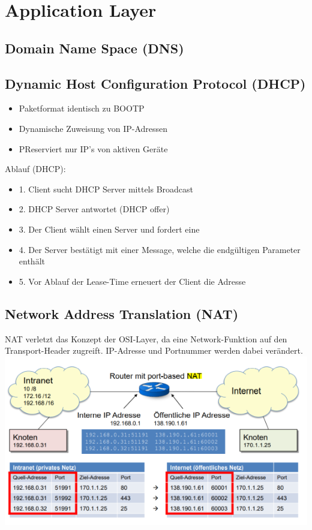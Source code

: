 \section{Application Layer}



\subsection{Domain Name Space (DNS)}

\subsection{Dynamic Host Configuration Protocol (DHCP)}{
    { \begin{itemize}[noitemsep]
                \item Paketformat identisch zu BOOTP
                \item Dynamische Zuweisung von IP-Adressen
                \item PReserviert nur IP’s von aktiven Geräte

            \end{itemize}}

    \WhiteSpace
    {Ablauf (DHCP):
        \begin{itemize}[noitemsep]
            \item 1. Client sucht DHCP Server mittels Broadcast
            \item 2. DHCP Server antwortet (DHCP offer)
            \item 3. Der Client wählt einen Server und fordert eine
            \item 4. Der Server bestätigt mit einer Message, welche die endgültigen Parameter enthält
            \item 5. Vor Ablauf der Lease-Time erneuert der Client die
                  Adresse
        \end{itemize}
    }

}


\subsection{Network Address Translation (NAT)}
{
    NAT verletzt das Konzept der OSI-Layer, da eine Network-Funktion auf den Transport-Header
    zugreift. IP-Adresse und Portnummer werden dabei verändert.}
\includegraphics[scale=.45]{img/NAT.png}


